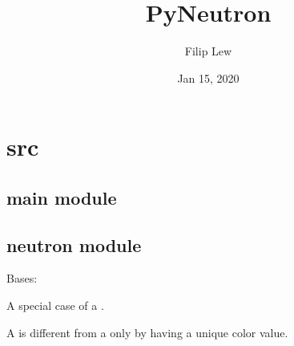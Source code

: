 \documentclass[letterpaper,10pt,english,openany,oneside]{sphinxmanual}
\title{PyNeutron}
\date{Jan 15, 2020}
\author{Filip Lew}
\begin{document}
\pagestyle{empty}
\sphinxmaketitle
\pagestyle{plain}
\sphinxtableofcontents
\pagestyle{normal}
\label{\detokenize{index::doc}}



\chapter{src}
\label{\detokenize{modules:src}}\label{\detokenize{modules::doc}}

\section{main module}
\label{\detokenize{main:module-main}}\label{\detokenize{main:main-module}}\label{\detokenize{main::doc}}

\section{neutron module}
\label{\detokenize{neutron:module-neutron}}\label{\detokenize{neutron:neutron-module}}\label{\detokenize{neutron::doc}}

\begin{fulllineitems}
\label{\detokenize{neutron:neutron.Neutron}}
Bases: {\hyperref[\detokenize{neutron:neutron.Soldier}]{}}

A special case of a {\hyperref[\detokenize{neutron:neutron.Soldier}]{}}.

A {\hyperref[\detokenize{neutron:neutron.Neutron}]{}} is different from a {\hyperref[\detokenize{neutron:neutron.Soldier}]{}} only by having a
unique color value.

\begin{fulllineitems}
\label{\detokenize{neutron:neutron.Neutron.VALUE}}
\end{fulllineitems}


\end{fulllineitems}
\end{document}
